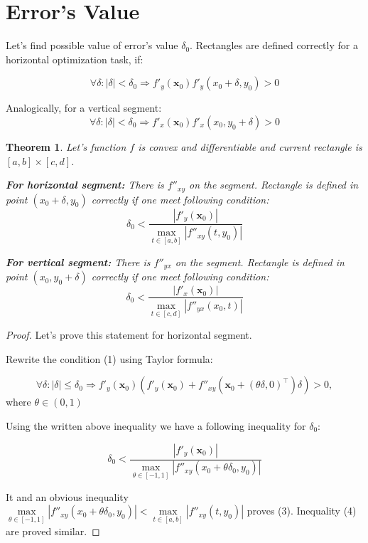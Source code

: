 \documentclass[12pt]{article}
\newtheorem{theorem}{Theorem}[section]
\begin{document}
\section{Error's Value}

Let's find possible value of error's value $\delta_0$. Rectangles are defined correctly for a horizontal optimization task, if:

\begin{equation}\label{1}
\forall\delta : |\delta| < \delta_0 \Rightarrow f'_y(\textbf{x}_0)f'_y(x_0+\delta, y_0) > 0
\end{equation}

Analogically, for a vertical segment:
\begin{equation}
\forall\delta: |\delta| < \delta_0 \Rightarrow f'_x(\textbf{x}_0)f'_x(x_0, y_0+\delta) > 0
\end{equation}
\begin{theorem}
Let's function $f$ is convex and differentiable and current rectangle is $[a,b]\times[c,d]$.

\textbf{For horizontal segment:}  There is $f''_{xy}$ on the segment. Rectangle is defined in point $(x_0 + \delta, y_0)$ correctly if one meet following condition:
\begin{equation}
\boxed{\delta_0 < \frac{|f'_y(\textbf{x}_0)|}{\max\limits_{t\in [a,b]}|f''_{xy}(t, y_0)|}}
\end{equation}

\textbf{For vertical segment:}  There is $f''_{yx}$ on the segment. Rectangle is defined in point $(x_0, y_0+\delta)$ correctly if one meet following condition:
\begin{equation}
\boxed{\delta_0 < \frac{|f'_x(\textbf{x}_0)|}{\max\limits_{t\in [c,d]}|f''_{yx}(x_0, t)|}}
\end{equation}

\end{theorem}
\begin{proof}

Let's prove this statement for horizontal segment.

Rewrite the condition (1) using Taylor formula:

$$\forall \delta:|\delta|\leq\delta_0\Rightarrow f'_y(\textbf{x}_0)\left(f'_y(\textbf{x}_0)+f''_{xy}\left(\textbf{x}_0+(\theta\delta,0)^\top\right)\delta\right) > 0,$$
where $\theta\in(0,1)$

Using the written above inequality we have a following inequality for $\delta_0$:

$$\delta_0<\frac{|f'_y(\textbf{x}_0)|}{\max\limits_{\theta \in [-1, 1]}|f''_{xy}(x_0 + \theta\delta_0, y_0)|}$$

It and an obvious inequality $\max\limits_{\theta \in [-1, 1]}|f''_{xy}(x_0 + \theta\delta_0, y_0)| < \max\limits_{t\in [a,b]}|f''_{xy}(t, y_0)|$ proves (3). Inequality (4) are proved similar.
\end{proof}
\end{document}
